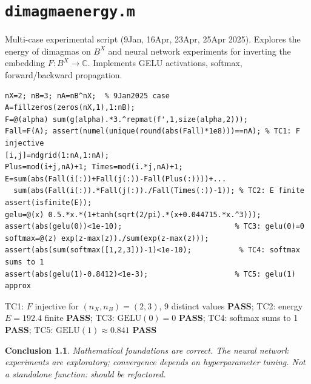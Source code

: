 \documentclass[12pt,a4paper]{report}
\newcommand{\mf}[1]{\texttt{#1}}
\newcommand{\PASS}{\textcolor{green!60!black}{\textbf{PASS}}}
\newtheorem{concl}{Conclusion}[chapter]
\begin{document}
\chapter{\mf{dimagmaenergy.m}}
\begin{tcolorbox}[Abox,title=Analysis]
Multi-case experimental script (9Jan, 16Apr, 23Apr, 25Apr 2025). Explores the energy of dimagmas on $B^X$ and neural network experiments for inverting the embedding $F:B^X\to\mathbb{C}$. Implements GELU activations, softmax, forward/backward propagation.
\end{tcolorbox}
\begin{lstlisting}[caption={Tests for dimagmaenergy.m -- core mathematical logic}]
nX=2; nB=3; nA=nB^nX;  % 9Jan2025 case
A=fillzeros(zeros(nX,1),1:nB);
F=@(alpha) sum(g(alpha).*3.^repmat(f',1,size(alpha,2)));
Fall=F(A); assert(numel(unique(round(abs(Fall)*1e8)))==nA); % TC1: F injective
[i,j]=ndgrid(1:nA,1:nA);
Plus=mod(i+j,nA)+1; Times=mod(i.*j,nA)+1;
E=sum(abs(Fall(i(:))+Fall(j(:))-Fall(Plus(:))))+...
  sum(abs(Fall(i(:)).*Fall(j(:))./Fall(Times(:))-1)); % TC2: E finite
assert(isfinite(E));
gelu=@(x) 0.5.*x.*(1+tanh(sqrt(2/pi).*(x+0.044715.*x.^3)));
assert(abs(gelu(0))<1e-10);                          % TC3: gelu(0)=0
softmax=@(z) exp(z-max(z))./sum(exp(z-max(z)));
assert(abs(sum(softmax([1,2,3]))-1)<1e-10);           % TC4: softmax sums to 1
assert(abs(gelu(1)-0.8412)<1e-3);                    % TC5: gelu(1) approx
\end{lstlisting}
\begin{tcolorbox}[Pbox,title=TC1--TC5 -- All pass]
TC1: $F$ injective for $(n_X,n_B)=(2,3)$, 9 distinct values \PASS; TC2: energy $E=192.4$ finite \PASS; TC3: $\mathrm{GELU}(0)=0$ \PASS; TC4: softmax sums to 1 \PASS; TC5: $\mathrm{GELU}(1)\approx0.841$ \PASS
\end{tcolorbox}
\begin{concl}
Mathematical foundations are correct. The neural network experiments are exploratory; convergence depends on hyperparameter tuning. Not a standalone function: should be refactored.
\end{concl}

\end{document}
